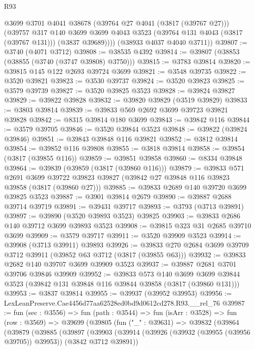 \begin{lexlean}{R93}
\begin{coremodule}
          @3699
          @3701
          @4041
          @38678
          (@39764 @27 @4041 (@3817 (@39767 @27)))
          (@39757
            @317
            @140
            @3699
            @3699
            @4043
            @3523
            (@39764 @131 @4043 (@3817 (@39767 @131)))
            (@3837 @39689))))
      (@38933 @4037 @4040 @3711))
@39807 := @3740 (@4071 @3712)
@39808 := @38535 @4392
@39814 := @39807 (@38853 (@38855 (@3740 (@3747 @39808) @3750)))
@39815 := @3783 @39814
@39820 := @39815 @145 @122 @2693 @39724 @3699
@39821 := @3548 @39735
@39822 := @3520 @39821
@39823 := @3530 @39737
@39824 := @3520 @39823
@39825 := @3579 @39739
@39827 := @3520 @39825 @3523
@39828 := @39824 @39827
@39829 := @39822 @39828
@39832 := @39820 @39829 (@3519 @39829)
@39833 := @3803 @39814
@39839 := @39833 @569 @2692 @3699 @39723 @39821 @39828
@39842 := @8315 @39814 @180 @3699
@39843 := @39842 @116
@39844 := @3579 @39705
@39846 := @3520 @39844 @3523
@39848 := @39822 (@39824 @39846)
@39851 := @39843 @39848 @116 @39821
@39852 := @3812 @39814
@39854 := @39852 @116 @39808
@39855 := @3818 @39814
@39858 := @39854 (@3817 (@39855 @116))
@39859 := @39851 @39858
@39860 := @8334 @39848
@39864 := @39839 (@39859 (@3817 (@39860 @116)))
@39879 := @39833
    @571
    @2691
    @3699
    @39722
    @39823
    @39827
    (@39842 @27 @39848 @116 @39823 @39858 (@3817 (@39860 @27)))
@39885 := @39833 @2689 @140 @39720 @3699 @39825 @3523
@39887 := @3901 @39814 @2679
@39890 := @39887 @2688 @39714 @39719
@39891 := @39431 @39717
@39893 := @3793 (@3713 @39891)
@39897 := @39890 (@3520 @39893 @3523) @39825
@39903 := @39833 @2686 @140 @39712 @3699 @39893 @3523
@39908 := @39815 @323 @31 @2685 @39710 @3699
@39909 := @3579 @39717
@39911 := @3520 @39909 @3523
@39914 := @39908 (@3713 @39911) @39893
@39926 := @39833 @270 @2684 @3699 @39709 @3712 @39911 (@39852 @63 @3712 (@3817 (@39855 @63)))
@39932 := @39833 @2682 @140 @39707 @3699 @39909 @3523
@39937 := @39887 @2681 @3701 @39706 @39846 @39909
@39952 := @39833
    @573
    @140
    @3699
    @3699
    @39844
    @3523
    (@39842 @131 @39848 @116 @39844 @39858 (@3817 (@39860 @131)))
@39953 := @3837 @39814
@39955 := @39937 (@39952 @39953)
@39956 := LexLeanPreserve.Cae4456d77aa62528ed0bd9d0612cd278.R93.__rel_76
@39987 := fun (sec : @3556) =>
  fun (path : @3544) =>
  fun (isArr : @3528) =>
  fun (row : @3569) =>
  @39699
    (@39805
      (fun ("_" : @39631) =>
      @39832
        (@39864
          (@39879
            (@39885
              (@39897
                (@39903
                  (@39914 (@39926 (@39932 (@39955 (@39956 @39705)) @39953)) (@3842 @3712 @39891))

\end{coremodule}
\end{lexlean}
